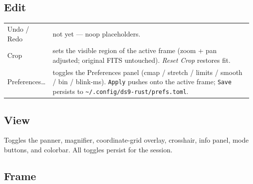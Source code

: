 \documentclass[11pt,a4paper]{article}
\begin{document}
\subsection{Edit}

\begin{tabular}{@{}>{\sffamily}lp{}@{}}
\toprule
Undo / Redo      & not yet --- noop placeholders. \\
Crop             & sets the visible region of the active frame
                   (zoom + pan adjusted; original FITS untouched).
                   \emph{Reset Crop} restores fit. \\
Preferences\dots & toggles the Preferences panel
                   (cmap / stretch / limits / smooth / bin / blink-ms).
                   \texttt{Apply} pushes onto the active frame;
                   \texttt{Save} persists to
                   \texttt{\textasciitilde/.config/ds9-rust/prefs.toml}. \\
\bottomrule
\end{tabular}

\subsection{View}

Toggles the panner, magnifier, coordinate-grid overlay, crosshair, info
panel, mode buttons, and colorbar. All toggles persist for the session.

\subsection{Frame}
\end{document}
